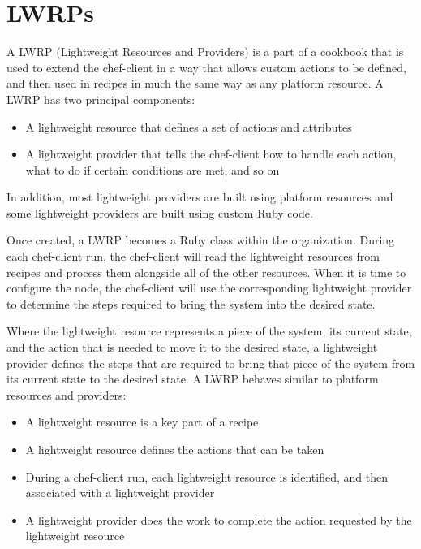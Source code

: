\section{LWRPs}
\label{sec:cookbook-lwrp}

A LWRP (Lightweight Resources and Providers) is a part of a cookbook that is used to extend the chef-client in a way that allows custom actions to be defined, and then used in recipes in much the same way as any platform resource. A LWRP has two principal components:

\begin{itemize}
  \item A lightweight resource that defines a set of actions and attributes
  \item A lightweight provider that tells the chef-client how to handle each action, what to do if certain conditions are met, and so on
\end{itemize}

In addition, most lightweight providers are built using platform resources and some lightweight providers are built using custom Ruby code.

Once created, a LWRP becomes a Ruby class within the organization. During each chef-client run, the chef-client will read the lightweight resources from recipes and process them alongside all of the other resources. When it is time to configure the node, the chef-client will use the corresponding lightweight provider to determine the steps required to bring the system into the desired state.

Where the lightweight resource represents a piece of the system, its current state, and the action that is needed to move it to the desired state, a lightweight provider defines the steps that are required to bring that piece of the system from its current state to the desired state. A LWRP behaves similar to platform resources and providers:

\begin{itemize}
  \item A lightweight resource is a key part of a recipe
  \item A lightweight resource defines the actions that can be taken
  \item During a chef-client run, each lightweight resource is identified, and then associated with a lightweight provider
  \item A lightweight provider does the work to complete the action requested by the lightweight resource
\end{itemize}

